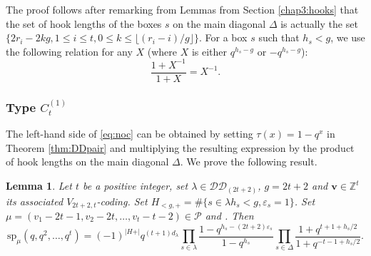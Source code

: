 \documentclass[11pt,letterpaper]{amsart}
\def\bbbz{\mathbb Z}
\def\ccdd{\mathcal {DD}}
\def\ccp{\mathcal P}
\newtheorem{lm}[df]{Lemma}
\renewcommand{\sp}{\mathrm{sp}}
\numberwithin{equation}{section}
\numberwithin{df}{section}
\begin{document}
The proof follows after remarking from Lemmas from Section \ref{chap3:hooks} that the set of hook lengths of the boxes $s$ on the main diagonal $\Delta$ is actually the set $\lbrace
2r_i-2kg,1\leq i \leq t, 0\leq k\leq \lfloor (r_i-i)/g\rfloor\rbrace$. For a box $s$ such that $h_s<g$, we use the following relation for any $X$ (where $X$ is either $q^{h_s-g}$ or $-q^{h_s-g}$):
$$\frac{1+X^{-1}}{1+X}=X^{-1}.$$



\subsubsection{Type $C^{(1)}_{t}$}

 The left-hand side of \eqref{eq:noc} can be obtained by setting $\tau(x)=1-q^x$ in Theorem \ref{thm:DDpair} and multiplying the resulting expression by the product of hook lengths on the main diagonal $\Delta$. We prove the following result.
\begin{lm}\label{lem:schurinter}
Let $t$ be a positive integer, set $\lambda\in\ccdd_{(2t+2)}$, $g=2t+2$ and $\mathbf{v}\in\bbbz^t$ its associated $V_{2t+2,t}$-coding. Set $H_{<g,+}=\#\lbrace s\in\lambda h_s<g, \varepsilon_s=1\rbrace$.
 Set $\mu=(v_1-2t-1,v_2-2t,\dots,v_t-t-2)\in\ccp$ and . Then
 \begin{equation}\label{eq:schursp}
\sp_{\mu}(q,q^2,\dots,q^t)=(-1)^{\lvert H+\rvert} q^{(t+1)d_\lambda}\prod_{s\in\lambda}\frac{1-q^{h_s-(2t+2)\varepsilon_s}}{1-q^{h_s}}\prod_{s\in\Delta}\frac{1+q^{t+1+h_s/2}}{1+q^{-t-1+h_s/2}}.
 \end{equation}
 \end{lm}
 
\end{document}
